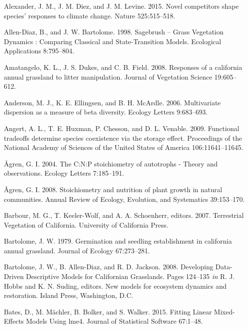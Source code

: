 \documentclass[twoside,12pt,final]{ucthesis-CA2012}
\newlength{\cslhangindent}
\newenvironment{cslreferences}%
  {\setlength{\parindent}{0pt}%
  \everypar{\setlength{\hangindent}{\cslhangindent}}\ignorespaces}%
  {\par}
\begin{document}
\begin{ucmainmatter}
\begin{cslreferences}
\leavevmode\hypertarget{ref-Alexander2015}{}%
Alexander, J. M., J. M. Diez, and J. M. Levine. 2015. Novel competitors shape species' responses to climate change. Nature 525:515--518.

\leavevmode\hypertarget{ref-Allen-Diaz1998}{}%
Allen-Diaz, B., and J. W. Bartolome. 1998. Sagebrush -- Grass Vegetation Dynamics : Comparing Classical and State-Transition Models. Ecological Applications 8:795--804.

\leavevmode\hypertarget{ref-amatangelo2008}{}%
Amatangelo, K. L., J. S. Dukes, and C. B. Field. 2008. Responses of a california annual grassland to litter manipulation. Journal of Vegetation Science 19:605--612.

\leavevmode\hypertarget{ref-Anderson2006}{}%
Anderson, M. J., K. E. Ellingsen, and B. H. McArdle. 2006. Multivariate dispersion as a measure of beta diversity. Ecology Letters 9:683--693.

\leavevmode\hypertarget{ref-Angert2009}{}%
Angert, A. L., T. E. Huxman, P. Chesson, and D. L. Venable. 2009. Functional tradeoffs determine species coexistence via the storage effect. Proceedings of the National Academy of Sciences of the United States of America 106:11641--11645.

\leavevmode\hypertarget{ref-Agren2004}{}%
Ågren, G. I. 2004. The C:N:P stoichiometry of autotrophs - Theory and observations. Ecology Letters 7:185--191.

\leavevmode\hypertarget{ref-Agren2008}{}%
Ågren, G. I. 2008. Stoichiometry and nutrition of plant growth in natural communities. Annual Review of Ecology, Evolution, and Systematics 39:153--170.

\leavevmode\hypertarget{ref-Barbour2007}{}%
Barbour, M. G., T. Keeler-Wolf, and A. A. Schoenherr, editors. 2007. Terrestrial Vegetation of California. University of California Press.

\leavevmode\hypertarget{ref-bartolome1979}{}%
Bartolome, J. W. 1979. Germination and seedling establishment in california annual grassland. Journal of Ecology 67:273--281.

\leavevmode\hypertarget{ref-Bartolome2008}{}%
Bartolome, J. W., B. Allen-Diaz, and R. D. Jackson. 2008. Developing Data-Driven Descriptive Models for Californian Grasslands. Pages 124--135 \emph{in} R. J. Hobbs and K. N. Suding, editors. New models for ecosystem dynamics and restoration. Island Press, Washington, D.C.

\leavevmode\hypertarget{ref-Bates2015}{}%
Bates, D., M. Mächler, B. Bolker, and S. Walker. 2015. Fitting Linear Mixed-Effects Models Using lme4. Journal of Statistical Software 67:1--48.


\end{cslreferences}
\end{ucmainmatter}
\end{document}
